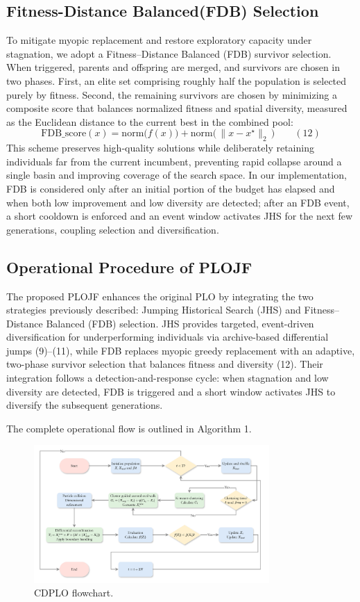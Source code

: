 \documentclass[3p]{elsarticle}
\begin{document}
\subsection{Fitness-Distance Balanced(FDB) Selection}
To mitigate myopic replacement and restore exploratory capacity under stagnation, we adopt a Fitness–Distance Balanced (FDB) survivor selection. When triggered, parents and offspring are merged, and survivors are chosen in two phases. First, an elite set comprising roughly half the population is selected purely by fitness. Second, the remaining survivors are chosen by minimizing a composite score that balances normalized fitness and spatial diversity, measured as the Euclidean distance to the current best in the combined pool:
\[ \mathrm{FDB\_score}(x) = \mathrm{norm}\bigl(f(x)\bigr) + \mathrm{norm}\bigl(\,\|x - x^{\star}\|_2\,\bigr) \qquad(12) \]
This scheme preserves high-quality solutions while deliberately retaining individuals far from the current incumbent, preventing rapid collapse around a single basin and improving coverage of the search space. In our implementation, FDB is considered only after an initial portion of the budget has elapsed and when both low improvement and low diversity are detected; after an FDB event, a short cooldown is enforced and an event window activates JHS for the next few generations, coupling selection and diversification.

\subsection{Operational Procedure of PLOJF}
The proposed PLOJF enhances the original PLO by integrating the two strategies previously described: Jumping Historical Search (JHS) and Fitness–Distance Balanced (FDB) selection. JHS provides targeted, event-driven diversification for underperforming individuals via archive-based differential jumps (9)–(11), while FDB replaces myopic greedy replacement with an adaptive, two-phase survivor selection that balances fitness and diversity (12). Their integration follows a detection-and-response cycle: when stagnation and low diversity are detected, FDB is triggered and a short window activates JHS to diversify the subsequent generations.

The complete operational flow is outlined in Algorithm 1.

\begin{figure}[h]
\centering
\includegraphics[width=0.8\textwidth]{CDPLO-flowchart}
\caption{CDPLO flowchart.}
\label{fig:flowchart}
\end{figure}
\end{document}
